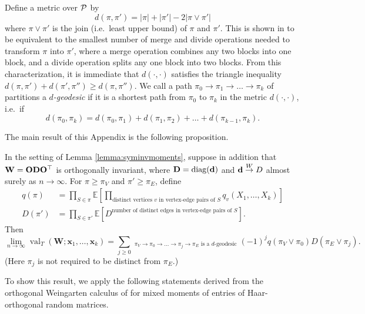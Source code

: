 \documentclass[10pt,reqno]{amsart}
\def\x{\mathbf{x}}
\def\W{\mathbf{W}}
\def\E{\mathbb{E}}
\def\diag{\operatorname{diag}}
\def\val{\operatorname{val}}
\def\toW{\overset{W}{\to}}
\def\bW{{\mathbf{W}}}
\begin{document}
Define a metric over $\mathcal{P}$ by
\begin{equation}\label{eq:metric}
d(\pi,\pi')=|\pi|+|\pi'|-2|\pi \vee \pi'|
\end{equation}
where $\pi \vee \pi'$ is the join (i.e.\ least upper bound) of $\pi$ and $\pi'$.
This is shown in
\cite{arabie1973multidimensional,boorman1973metrics} to be equivalent to the
smallest number of merge and divide operations needed to transform $\pi$ into
$\pi'$, where a merge operation combines any two blocks into one block, and a
divide operation splits any one block into two blocks. From this
characterization, it is immediate that $d(\cdot,\cdot)$ satisfies the triangle
inequality $d(\pi,\pi')+d(\pi',\pi'') \geq d(\pi,\pi'')$.
We call a path $\pi_0 \to \pi_1 \to \ldots \to \pi_k$ of partitions
a \emph{$d$-geodesic} if it is a shortest path from $\pi_0$ to $\pi_k$ in the
metric $d(\cdot,\cdot)$, i.e.\ if
\[d(\pi_0,\pi_k)=d(\pi_0,\pi_1)+d(\pi_1,\pi_2)+\ldots+d(\pi_{k-1},\pi_k).\]

The main result of this Appendix is the following proposition.

\begin{proposition}\label{prop:orthogonallimval}
In the setting of Lemma \ref{lemma:syminvmoments}, suppose in addition that
$\bW=\bO\bD\bO^\top$ is orthogonally invariant,
where $\bD=\diag(\bd)$ and $\bd\toW D$ almost surely as $n \to \infty$.
For $\pi \geq \pi_V$ and $\pi' \geq \pi_E$, define
\begin{align}
q(\pi)&=\prod_{S \in \pi} \E\left[\prod_{\text{distinct vertices } v
\text{ in vertex-edge pairs of } S} q_v(X_1,\ldots,X_k)\right]
\label{eq:qlimortho_appendix}\\
D(\pi')&=\prod_{S \in \pi'} \E\left[D^{\text{number of distinct edges in
vertex-edge pairs of } S}\right].\label{eq:Dlimortho}
\end{align}
Then
\[\lim_{n \to \infty} \val_T(\W;\x_1,\ldots,\x_k)
=\sum_{j \geq 0} \mathop{\sum_{\text{distinct pairings }
\pi_0,\ldots,\pi_j \text{ of } [2w]}}_{\pi_V \to \pi_0 \to \ldots \to \pi_j
\to \pi_E \text{ is a } d\text{-geodesic}}
(-1)^j q(\pi_V \vee \pi_0)D(\pi_E \vee \pi_j).\]
(Here $\pi_j$ is not required to be distinct from $\pi_E$.)
\end{proposition}

To show this result, we apply the following statements
derived from the orthogonal Weingarten calculus
of \cite{collins2006integration} for mixed moments of entries of
Haar-orthogonal random matrices.
\end{document}
